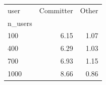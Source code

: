 \begin{tabular}{lrr}
\toprule
user & Committer & Other \\
n_users &  &  \\
\midrule
100 & 6.15 & 1.07 \\
400 & 6.29 & 1.03 \\
700 & 6.93 & 1.15 \\
1000 & 8.66 & 0.86 \\
\bottomrule
\end{tabular}
